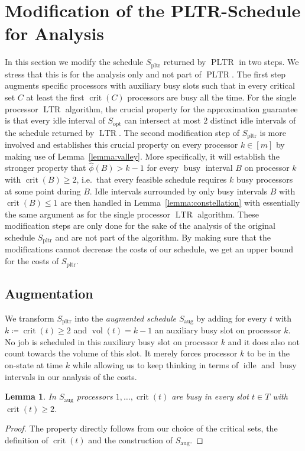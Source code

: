 \documentclass[a4paper]{article}
\DeclareMathOperator{\idle}{idle}
\DeclareMathOperator{\busy}{busy}
\DeclareMathOperator{\opt}{opt}
\DeclareMathOperator{\pltr}{pltr}
\DeclareMathOperator{\PLTR}{PLTR}
\DeclareMathOperator{\LTR}{LTR}
\DeclareMathOperator{\aug}{aug}
\DeclareMathOperator{\vol}{vol}
\DeclareMathOperator{\crit}{crit}
\newtheorem{lemma}[theorem]{Lemma}
\begin{document}
\section{Modification of the PLTR-Schedule for Analysis}\label{section:approximation}
In this section we modify the schedule $S_{\pltr}$ returned by $\PLTR$ in two steps.
We stress that this is for the analysis only and not part of $\PLTR$.
The first step augments specific processors with auxiliary busy slots such that in every critical set $C$ at least the first $\crit(C)$ processors are busy all the time.
For the single processor $\LTR$ algorithm, the crucial property for the approximation guarantee is that every idle interval of $S_{\opt}$ can intersect at most $2$ distinct idle intervals of the schedule returned by $\LTR$.
The second modification step of $S_{\pltr}$ is more involved and establishes this crucial property on every processor $k \in [m]$ by making use of Lemma~\ref{lemma:valley}.
More specifically, it will establish the stronger property that $\hat \phi(B) > k - 1$ for every $\busy$ interval $B$ on processor $k$ with $\crit(B) \geq 2$, i.e.\ that every feasible schedule requires $k$ busy processors at some point during $B$.
Idle intervals surrounded by only busy intervals $B$ with $\crit(B) \leq 1$ are then handled in Lemma~\ref{lemma:constellation} with essentially the same argument as for the single processor $\LTR$ algorithm.
These modification steps are only done for the sake of the analysis of the original schedule $S_{\pltr}$ and are not part of the algorithm.
By making sure that the modifications cannot decrease the costs of our schedule, we get an upper bound for the costs of $S_{\pltr}$.

\subsection{Augmentation}
We transform $S_{\pltr}$ into the \emph{augmented schedule $S_{\aug}$} by adding for every $t$ with $k \coloneqq \crit(t) \geq 2$ and $\vol(t) = k-1$ an auxiliary busy slot on processor $k$.
No job is scheduled in this auxiliary busy slot on processor $k$ and it does also not count towards the volume of this slot.
It merely forces processor $k$ to be in the on-state at time $k$ while allowing us to keep thinking in terms of $\idle$ and $\busy$ intervals in our analysis of the costs.

\begin{lemma}\label{lemma:augmented}
  In $S_{\aug}$ processors $1, \ldots, \crit(t)$ are busy in every slot $t \in T$ with $\crit(t) \geq 2$.
\end{lemma}
\begin{proof}
  The property directly follows from our choice of the critical sets, the definition of $\crit(t)$ and the construction of $S_{\aug}$.
\end{proof}
\end{document}
